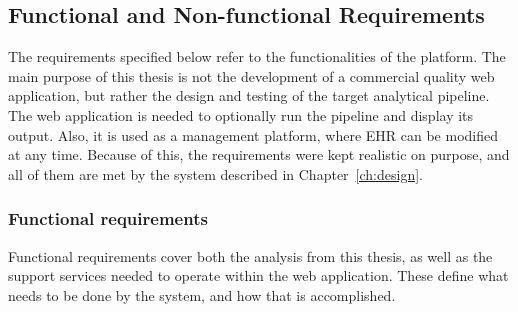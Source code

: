 \subsection{Functional and Non-functional Requirements}

The requirements specified below refer to the functionalities of the platform. The main purpose of this thesis is not the development of a commercial quality web application, but rather the design and testing of the target analytical pipeline. The web application is needed to optionally run the pipeline and display its output. Also, it is used as a management platform, where EHR can be modified at any time. Because of this, the requirements were kept realistic on purpose, and all of them are met by the system described in Chapter~\ref{ch:design}.

\subsubsection*{Functional requirements}

Functional requirements cover both the analysis from this thesis, as well as the support services needed to operate within the web application. These define what needs to be done by the system, and how that is accomplished.

